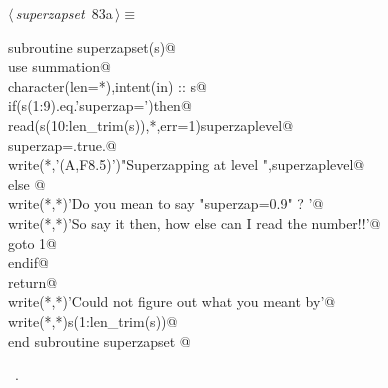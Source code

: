 \documentclass[10pt,a4paper,notitlepage]{article}
\begin{document}
\begin{flushleft} \small
\begin{minipage}{\linewidth}\label{scrap100}\raggedright\small
{} $\langle\,${\it superzapset}\nobreak\ {\footnotesize {83a}}$\,\rangle\equiv$
\vspace{-1ex}
\begin{list}{}{} \item
\mbox{}\verb@      subroutine superzapset(s)@\\
\mbox{}\verb@      use summation@\\
\mbox{}\verb@      character(len=*),intent(in) :: s@\\
\mbox{}\verb@      if(s(1:9).eq.'superzap=')then@\\
\mbox{}\verb@        read(s(10:len_trim(s)),*,err=1)superzaplevel@\\
\mbox{}\verb@        superzap=.true.@\\
\mbox{}\verb@        write(*,'(A,F8.5)')"Superzapping at level ",superzaplevel@\\
\mbox{}\verb@      else @\\
\mbox{}\verb@        write(*,*)'Do you mean to say "superzap=0.9" ? '@\\
\mbox{}\verb@        write(*,*)'So say it then, how else can I read the number!!'@\\
\mbox{}\verb@        goto 1@\\
\mbox{}\verb@      endif@\\
\mbox{}\verb@      return@\\
\mbox{}     write(*,*)'Could not figure out what you meant by'@\\
\mbox{}\verb@      write(*,*)s(1:len_trim(s))@\\
\mbox{}\verb@      end subroutine superzapset                                  @{\NWsep}
\end{list}
\vspace{-1.5ex}
\footnotesize
\begin{list}{}{\setlength{\itemsep}{-\parsep}\setlength{\itemindent}{-\leftmargin}}
\item \NWtxtMacroRefIn\ .

\item{}
\end{list}
\end{minipage}\vspace{4ex}
\end{flushleft}
\end{document}
